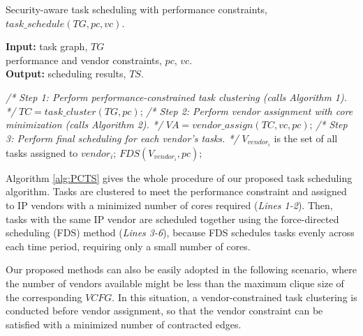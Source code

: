 \documentclass[10pt,journal, compsoc]{IEEEtran}
\begin{document}
\begin{algorithm}[!h]
\caption{Security-aware task scheduling with performance constraints, $task\_schedule(TG, pc, vc)$.}
\label{alg:PCTS}
{\textbf{Input:}} task graph, $TG$\\
\hspace*{2.4em} performance and vendor constraints, $pc$, $vc$.\\
{\textbf{Output:}} scheduling results, $TS$.
\begin{algorithmic}[1]
\STATEx \hspace*{-\algorithmicindent}\textit{/* Step 1: Perform performance-constrained task clustering (calls Algorithm 1). */}
\STATE $TC=task\_cluster(TG,pc)$;
\STATEx \hspace*{-\algorithmicindent}\textit{/* Step 2: Perform vendor assignment with core minimization (calls Algorithm 2). */}
\STATE $VA=vendor\_assign(TC, vc, pc)$;
\STATEx \hspace*{-\algorithmicindent}\textit{/* Step 3: Perform final scheduling for each vendor's tasks. */}
    \STATE $V_{vendor_i}$ is the set of all tasks assigned to $vendor_i$;
    \STATE $FDS(V_{vendor_i}, pc)$;
\ENDFOR
\end{algorithmic}
\end{algorithm}



Algorithm \ref{alg:PCTS} gives the whole procedure of our proposed task scheduling algorithm. Tasks are clustered to meet the performance constraint and assigned to IP vendors with a minimized number of cores required (\textit{Lines 1-2}). Then, tasks with the same IP vendor are scheduled together using the force-directed scheduling (FDS) method \cite{article:PP} (\textit{Lines 3-6}), because FDS schedules tasks evenly across each time period, requiring only a small number of cores. %

Our proposed methods can also be easily adopted in the following scenario, where the number of vendors available might be less than the maximum clique size of the corresponding $VCFG$. In this situation, a vendor-constrained task clustering \cite{article:NW} is conducted before vendor assignment, so that the vendor constraint can be satisfied with a minimized number of contracted edges.%
\end{document}
